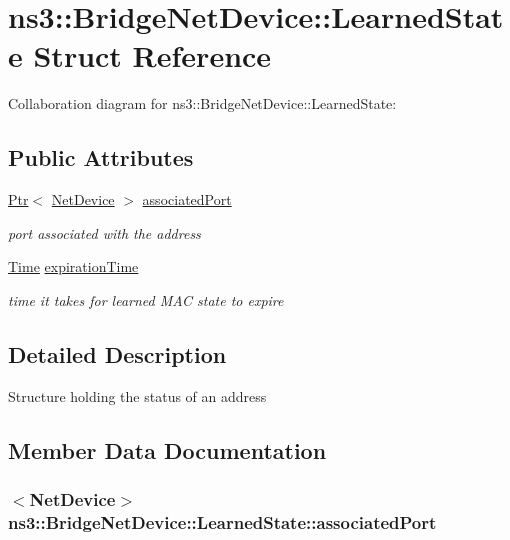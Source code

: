 \hypertarget{structns3_1_1BridgeNetDevice_1_1LearnedState}{}\section{ns3\+:\+:Bridge\+Net\+Device\+:\+:Learned\+State Struct Reference}
\label{structns3_1_1BridgeNetDevice_1_1LearnedState}


Collaboration diagram for ns3\+:\+:Bridge\+Net\+Device\+:\+:Learned\+State\+:
\subsection*{Public Attributes}
\begin{DoxyCompactItemize}
\item 
\hyperlink{classns3_1_1Ptr}{Ptr}$<$ \hyperlink{classns3_1_1NetDevice}{Net\+Device} $>$ \hyperlink{structns3_1_1BridgeNetDevice_1_1LearnedState_a4bdf9dcff8573df24626c046e4286c51}{associated\+Port}
\begin{DoxyCompactList}\small\item\em port associated with the address \end{DoxyCompactList}\item 
\hyperlink{classns3_1_1Time}{Time} \hyperlink{structns3_1_1BridgeNetDevice_1_1LearnedState_a2bb61bbc1795ebc69bd90bb5525829c1}{expiration\+Time}
\begin{DoxyCompactList}\small\item\em time it takes for learned M\+AC state to expire \end{DoxyCompactList}\end{DoxyCompactItemize}


\subsection{Detailed Description}
Structure holding the status of an address 

\subsection{Member Data Documentation}
\subsubsection[{\texorpdfstring{associated\+Port}{associatedPort}}]{$<${\bf Net\+Device}$>$ ns3\+::\+Bridge\+Net\+Device\+::\+Learned\+State\+::associated\+Port}\hypertarget{structns3_1_1BridgeNetDevice_1_1LearnedState_a4bdf9dcff8573df24626c046e4286c51}{}\label{structns3_1_1BridgeNetDevice_1_1LearnedState_a4bdf9dcff8573df24626c046e4286c51}



